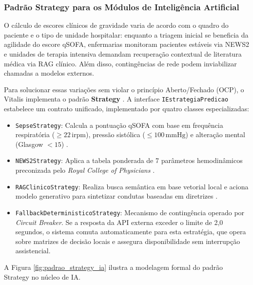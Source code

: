 \subsubsection{Padrão Strategy para os Módulos de Inteligência Artificial}
O cálculo de escores clínicos de gravidade varia de acordo com o quadro do paciente e o tipo de unidade hospitalar: enquanto a triagem inicial se beneficia da agilidade do escore qSOFA, enfermarias monitoram pacientes estáveis via NEWS2 e unidades de terapia intensiva demandam recuperação contextual de literatura médica via RAG clínico. Além disso, contingências de rede podem inviabilizar chamadas a modelos externos.

Para solucionar essas variações sem violar o princípio Aberto/Fechado (OCP), o Vitalis implementa o padrão \textbf{Strategy} \cite{gamma_design_patterns:1994}. A interface \texttt{IEstrategiaPredicao} estabelece um contrato unificado, implementado por quatro classes especializadas:

\begin{itemize}[leftmargin=*]
    \item \texttt{SepseStrategy}: Calcula a pontuação qSOFA com base em frequência respiratória ($\ge 22\,\text{irpm}$), pressão sistólica ($\le 100\,\text{mmHg}$) e alteração mental (Glasgow $< 15$) \cite{singer_sepsis:2016}.
    \item \texttt{NEWS2Strategy}: Aplica a tabela ponderada de 7 parâmetros hemodinâmicos preconizada pelo \textit{Royal College of Physicians} \cite{rcp_news2:2017}.
    \item \texttt{RAGClinicoStrategy}: Realiza busca semântica em base vetorial local e aciona modelo generativo para sintetizar condutas baseadas em diretrizes \cite{lewis_rag:2020}.
    \item \texttt{FallbackDeterministicoStrategy}: Mecanismo de contingência operado por \textit{Circuit Breaker}. Se a resposta da API externa exceder o limite de 2,0 segundos, o sistema comuta automaticamente para esta estratégia, que opera sobre matrizes de decisão locais e assegura disponibilidade sem interrupção assistencial.
\end{itemize}

A Figura \ref{fig:padrao_strategy_ia} ilustra a modelagem formal do padrão Strategy no núcleo de IA.

